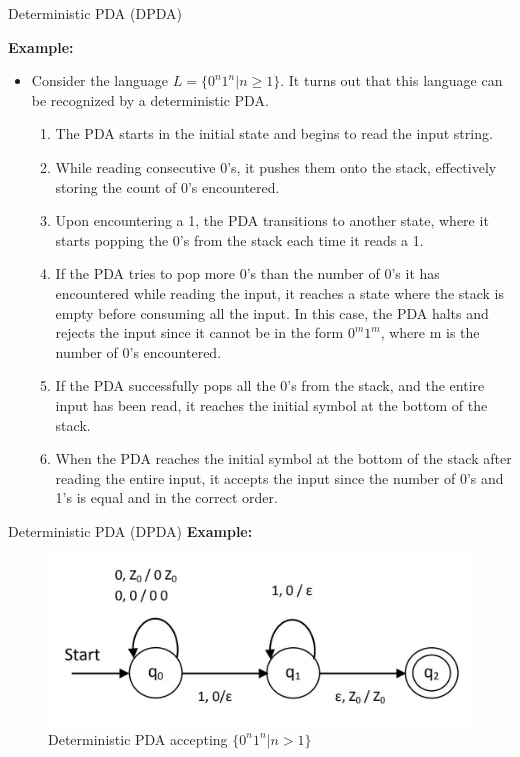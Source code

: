\documentclass{beamer}
\begin{document}
\begin{frame}{Deterministic PDA (DPDA)}

	\textbf{Example:}
	\begin{itemize}
		\item Consider the language $L = \{0^n1^n|n \geq 1\}$. It turns out that this language can be recognized by a deterministic PDA.
		 \begin{enumerate}
		 	\item The PDA starts in the initial state and begins to read the input string.
			
			\item While reading consecutive 0's, it pushes them onto the stack, effectively storing the count of 0's encountered.
			
			\item Upon encountering a 1, the PDA transitions to another state, where it starts popping the 0's from the stack each time it reads a 1.
			
			\item If the PDA tries to pop more 0's than the number of 0's it has encountered while reading the input, it reaches a state where the stack is empty before consuming all the input. In this case, the PDA halts and rejects the input since it cannot be in the form $0^m 1^m$, where m is the number of 0's encountered.
			
			\item If the PDA successfully pops all the 0's from the stack, and the entire input has been read, it reaches the initial symbol at the bottom of the stack.
			
			\item When the PDA reaches the initial symbol at the bottom of the stack after reading the entire input, it accepts the input since the number of 0's and 1's is equal and in the correct order.
		\end{enumerate}
	\end{itemize}
\end{frame}
\begin{frame}{Deterministic PDA (DPDA)}
	\textbf{Example:}
		\begin{figure}
		\includegraphics[scale=.3]{img4/m5}
		\caption{	Deterministic PDA accepting $\{0^n1^n| n > 1\}$}
	\end{figure}
\end{frame}
\end{document}
